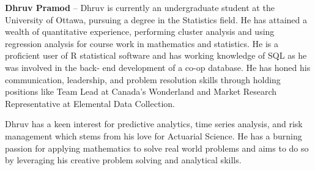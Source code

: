 \textbf{Dhruv Pramod} – Dhruv is currently an undergraduate student at the University of Ottawa, pursuing a degree in the Statistics field. He has attained a wealth of quantitative experience, performing cluster analysis and using regression analysis for course work in mathematics and statistics. He is a proficient user of R statistical software and has working knowledge of SQL as he was involved in the back- end development of a co-op database. He has honed his communication, leadership, and problem resolution skills through holding positions like Team Lead at Canada’s Wonderland and Market Research Representative at Elemental Data Collection. \par Dhruv has a keen interest for predictive analytics, time series analysis, and risk management which stems from his love for Actuarial Science. He has a burning passion for applying mathematics to solve real world problems and aims to do so by leveraging his creative problem solving and analytical skills. 